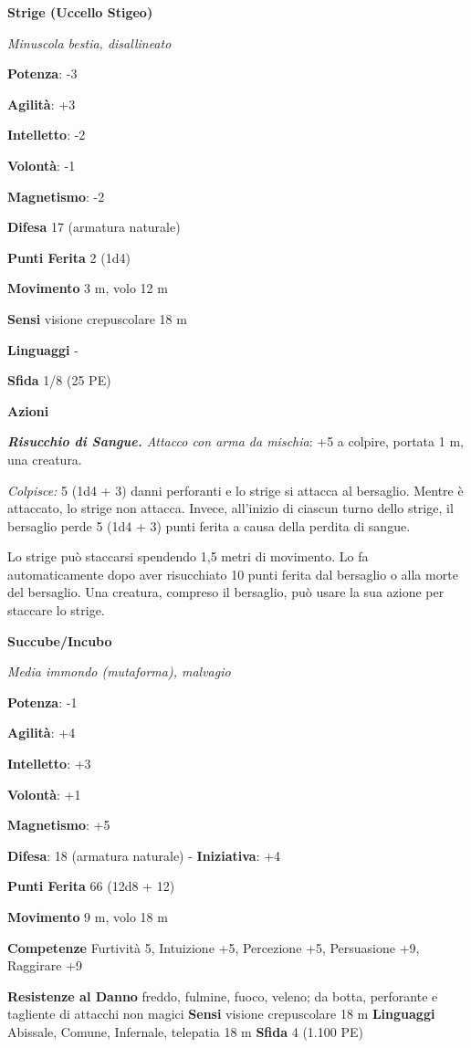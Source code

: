 \begin{multicols}{2}
\textbf{Strige (Uccello Stigeo)}

\emph{Minuscola bestia, disallineato}

\textbf{Potenza}: -3

\textbf{Agilità}: +3

\textbf{Intelletto}: -2

\textbf{Volontà}: -1

\textbf{Magnetismo}: -2

\textbf{Difesa} 17 (armatura naturale)

\textbf{Punti Ferita} 2 (1d4)

\textbf{Movimento} 3 m, volo 12 m

\textbf{Sensi} visione crepuscolare 18 m

\textbf{Linguaggi} -

\textbf{Sfida} 1/8 (25 PE)\smallskip

\smallskip\textbf{Azioni}

\emph{\textbf{Risucchio di Sangue.} Attacco con arma da mischia}: +5 a
colpire, portata 1 m, una creatura.

\emph{Colpisce:} 5 (1d4 + 3) danni perforanti e lo strige si attacca al
bersaglio. Mentre è attaccato, lo strige non attacca. Invece, all'inizio
di ciascun turno dello strige, il bersaglio perde 5 (1d4 + 3) punti
ferita a causa della perdita di sangue.

Lo strige può staccarsi spendendo 1,5 metri di movimento. Lo fa
automaticamente dopo aver risucchiato 10 punti ferita dal bersaglio o
alla morte del bersaglio. Una creatura, compreso il bersaglio, può usare
la sua azione per staccare lo strige.

\textbf{Succube/Incubo}

\emph{Media immondo (mutaforma), malvagio}

\textbf{Potenza}: -1

\textbf{Agilità}: +4

\textbf{Intelletto}: +3

\textbf{Volontà}: +1

\textbf{Magnetismo}: +5

\textbf{Difesa}: 18 (armatura naturale) - \textbf{Iniziativa}: +4

\textbf{Punti Ferita} 66 (12d8 + 12)

\textbf{Movimento} 9 m, volo 18 m

\textbf{Competenze} Furtività 5, Intuizione +5, Percezione +5, Persuasione
+9, Raggirare +9

\textbf{Resistenze al Danno} freddo, fulmine, fuoco, veleno;
da botta, perforante e tagliente di attacchi non magici
\textbf{Sensi} visione crepuscolare 18 m
\textbf{Linguaggi} Abissale, Comune, Infernale, telepatia 18 m
\textbf{Sfida} 4 (1.100 PE)\smallskip


\end{multicols}
